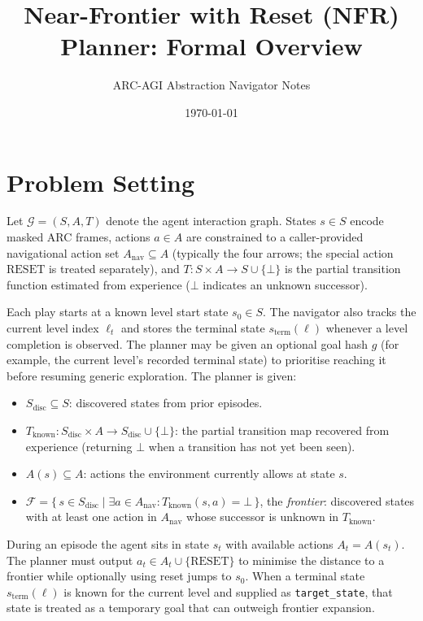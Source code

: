 \documentclass[11pt]{article}
\title{Near-Frontier with Reset (NFR) Planner: Formal Overview}
\author{ARC-AGI Abstraction Navigator Notes}
\date{\today}
\begin{document}
\maketitle

\section{Problem Setting}

Let $\mathcal{G} = (S, A, T)$ denote the agent interaction graph. States $s \in S$ encode masked ARC frames, actions $a \in A$ are constrained to a caller-provided navigational action set $A_{\mathrm{nav}} \subseteq A$ (typically the four arrows; the special action $\mathrm{RESET}$ is treated separately), and $T : S \times A \to S \cup \{\bot\}$ is the partial transition function estimated from experience ($\bot$ indicates an unknown successor).

Each play starts at a known level start state $s_0 \in S$. The navigator also tracks the current level index $\ell_t$ and stores the terminal state $s_{\mathrm{term}}(\ell)$ whenever a level completion is observed. The planner may be given an optional goal hash $g$ (for example, the current level's recorded terminal state) to prioritise reaching it before resuming generic exploration. The planner is given:
\begin{itemize}
    \item $S_{\mathrm{disc}} \subseteq S$: discovered states from prior episodes.
    \item $T_{\mathrm{known}} : S_{\mathrm{disc}} \times A \to S_{\mathrm{disc}} \cup \{\bot\}$: the partial transition map recovered from experience (returning $\bot$ when a transition has not yet been seen).
    \item $A(s) \subseteq A$: actions the environment currently allows at state $s$.
    \item $\mathcal{F} = \{\, s \in S_{\mathrm{disc}} \mid \exists a \in A_{\mathrm{nav}} : T_{\mathrm{known}}(s,a) = \bot \,\}$, the \emph{frontier}: discovered states with at least one action in $A_{\mathrm{nav}}$ whose successor is unknown in $T_{\mathrm{known}}$.
\end{itemize}

During an episode the agent sits in state $s_t$ with available actions $A_t = A(s_t)$. The planner must output $a_t \in A_t \cup \{\mathrm{RESET}\}$ to minimise the distance to a frontier while optionally using reset jumps to $s_0$. When a terminal state $s_{\mathrm{term}}(\ell)$ is known for the current level and supplied as \texttt{target\_state}, that state is treated as a temporary goal that can outweigh frontier expansion.
\end{document}
